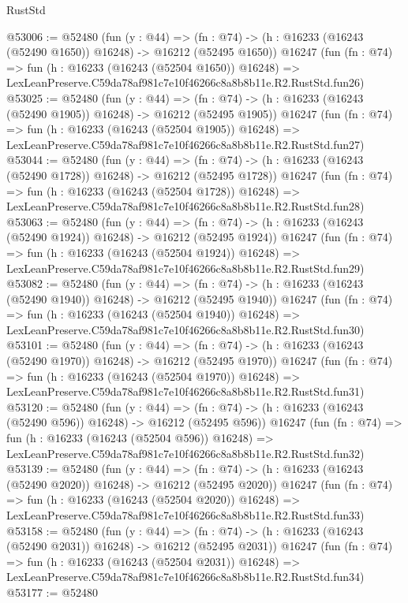 \begin{lexlean}{RustStd}
\begin{coremodule}
@53006 := @52480
    (fun (y : @44) =>
    (fn : @74) -> (h : @16233 (@16243 (@52490 @1650)) @16248) -> @16212 (@52495 @1650))
    @16247
    (fun (fn : @74) =>
    fun (h : @16233 (@16243 (@52504 @1650)) @16248) =>
    LexLeanPreserve.C59da78af981c7e10f46266c8a8b8b11e.R2.RustStd.fun26)
@53025 := @52480
    (fun (y : @44) =>
    (fn : @74) -> (h : @16233 (@16243 (@52490 @1905)) @16248) -> @16212 (@52495 @1905))
    @16247
    (fun (fn : @74) =>
    fun (h : @16233 (@16243 (@52504 @1905)) @16248) =>
    LexLeanPreserve.C59da78af981c7e10f46266c8a8b8b11e.R2.RustStd.fun27)
@53044 := @52480
    (fun (y : @44) =>
    (fn : @74) -> (h : @16233 (@16243 (@52490 @1728)) @16248) -> @16212 (@52495 @1728))
    @16247
    (fun (fn : @74) =>
    fun (h : @16233 (@16243 (@52504 @1728)) @16248) =>
    LexLeanPreserve.C59da78af981c7e10f46266c8a8b8b11e.R2.RustStd.fun28)
@53063 := @52480
    (fun (y : @44) =>
    (fn : @74) -> (h : @16233 (@16243 (@52490 @1924)) @16248) -> @16212 (@52495 @1924))
    @16247
    (fun (fn : @74) =>
    fun (h : @16233 (@16243 (@52504 @1924)) @16248) =>
    LexLeanPreserve.C59da78af981c7e10f46266c8a8b8b11e.R2.RustStd.fun29)
@53082 := @52480
    (fun (y : @44) =>
    (fn : @74) -> (h : @16233 (@16243 (@52490 @1940)) @16248) -> @16212 (@52495 @1940))
    @16247
    (fun (fn : @74) =>
    fun (h : @16233 (@16243 (@52504 @1940)) @16248) =>
    LexLeanPreserve.C59da78af981c7e10f46266c8a8b8b11e.R2.RustStd.fun30)
@53101 := @52480
    (fun (y : @44) =>
    (fn : @74) -> (h : @16233 (@16243 (@52490 @1970)) @16248) -> @16212 (@52495 @1970))
    @16247
    (fun (fn : @74) =>
    fun (h : @16233 (@16243 (@52504 @1970)) @16248) =>
    LexLeanPreserve.C59da78af981c7e10f46266c8a8b8b11e.R2.RustStd.fun31)
@53120 := @52480
    (fun (y : @44) =>
    (fn : @74) -> (h : @16233 (@16243 (@52490 @596)) @16248) -> @16212 (@52495 @596))
    @16247
    (fun (fn : @74) =>
    fun (h : @16233 (@16243 (@52504 @596)) @16248) =>
    LexLeanPreserve.C59da78af981c7e10f46266c8a8b8b11e.R2.RustStd.fun32)
@53139 := @52480
    (fun (y : @44) =>
    (fn : @74) -> (h : @16233 (@16243 (@52490 @2020)) @16248) -> @16212 (@52495 @2020))
    @16247
    (fun (fn : @74) =>
    fun (h : @16233 (@16243 (@52504 @2020)) @16248) =>
    LexLeanPreserve.C59da78af981c7e10f46266c8a8b8b11e.R2.RustStd.fun33)
@53158 := @52480
    (fun (y : @44) =>
    (fn : @74) -> (h : @16233 (@16243 (@52490 @2031)) @16248) -> @16212 (@52495 @2031))
    @16247
    (fun (fn : @74) =>
    fun (h : @16233 (@16243 (@52504 @2031)) @16248) =>
    LexLeanPreserve.C59da78af981c7e10f46266c8a8b8b11e.R2.RustStd.fun34)
@53177 := @52480

\end{coremodule}
\end{lexlean}
